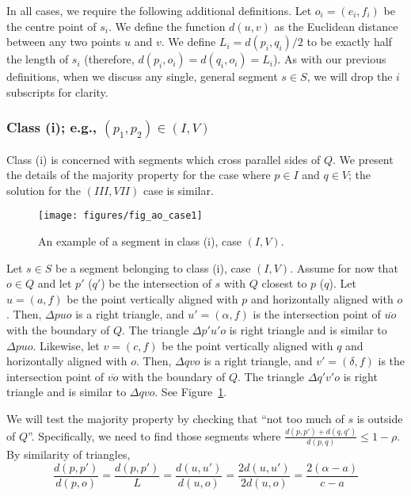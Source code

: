 In all cases, we require the following additional definitions. Let $o_i = (e_i, f_i)$ be the centre point of $s_i$.  We define the function $d(u,v)$ as the Euclidean distance between any two points $u$ and $v$. We define $L_i = d(p_i, q_i)/2$ to be exactly half the length of $s_i$ (therefore, $d(p_i, o_i) = d(q_i, o_i) = L_i$). As with our previous definitions, when we discuss any single, general segment $s \in S$, we will drop the $i$ subscripts for clarity.


\subsubsection*{Class (i); e.g., $(p_1, p_2) \in (I, V)$}
\label{:rectangles:ao:class1}

Class (i) is concerned with segments which cross parallel sides of $Q$. We present the details of the majority property for the case where $p \in I$ and $q \in V$; the solution for the $(III, VII)$ case is similar.

\begin{figure}[t]
\begin{center}
  \texttt{[image: figures/fig\_ao\_case1]}
  \caption{An example of a segment in class (i), case $(I, V)$.}
  \label{fig:rectangles:ao:case1}
\end{center}
\end{figure}

Let $s \in S$ be a segment belonging to class (i), case $(I, V)$.
Assume for now that $o \in Q$ and let $p'$ ($q'$) be the intersection of $s$ with $Q$ closest to $p$ ($q$).  
Let $u = (a, f)$ be the point vertically aligned with $p$ and horizontally aligned with $o$. Then, $\Delta p u o$ is a right triangle, and $u' = (\alpha, f)$ is the intersection point of $\overline{u o}$ with the boundary of $Q$.  
The triangle $\Delta p' u' o$ is right triangle and is similar to $\Delta p u o$. 
Likewise, let $v = (c, f)$ be the point vertically aligned with $q$ and horizontally aligned with $o$. Then, $\Delta q v o$ is a right triangle, and $v' = (\delta, f)$ is the intersection point of $\overline{v o}$ with the boundary of $Q$. The triangle $\Delta q' v' o$ is right triangle and is similar to $\Delta q v o$. See Figure~\ref{fig:rectangles:ao:case1}.

We will test the majority property by checking that ``not too much of $s$ is outside of $Q$''. Specifically, we need to find those segments where $\frac{d(p, p') + d(q, q')}{d(p, q)} \leq 1 - \rho$. By similarity of triangles, 
\[ 
\frac{d(p, p')}{d(p, o)} = \frac{d(p, p')}{L} = \frac{d(u, u')}{d(u, o)} = \frac{2 d(u, u')}{2 d(u, o)} = \frac{2(\alpha - a)}{c - a}
\]


